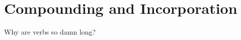 \chapter{Compounding and Incorporation}
\label{cha:compounding-incorporation}

Why are verbs so damn long?